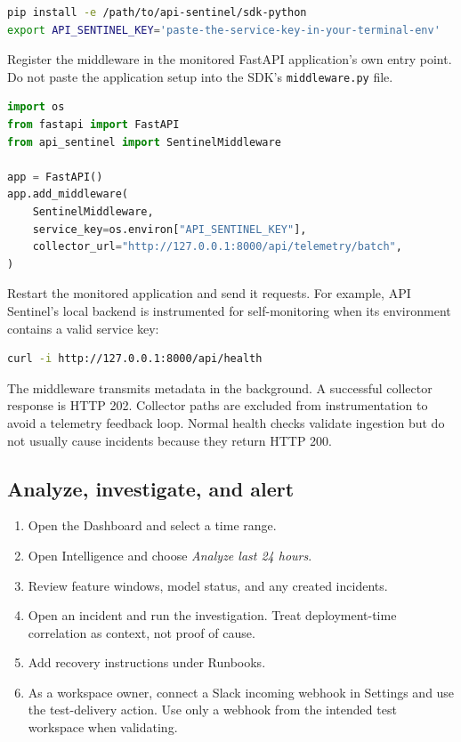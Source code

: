 \documentclass[11pt,a4paper]{article}
\begin{document}
\begin{lstlisting}[language=bash]
pip install -e /path/to/api-sentinel/sdk-python
export API_SENTINEL_KEY='paste-the-service-key-in-your-terminal-env'
\end{lstlisting}

Register the middleware in the monitored FastAPI application's own entry point.
Do not paste the application setup into the SDK's \texttt{middleware.py} file.

\begin{lstlisting}[language=Python]
import os
from fastapi import FastAPI
from api_sentinel import SentinelMiddleware

app = FastAPI()
app.add_middleware(
    SentinelMiddleware,
    service_key=os.environ["API_SENTINEL_KEY"],
    collector_url="http://127.0.0.1:8000/api/telemetry/batch",
)
\end{lstlisting}

Restart the monitored application and send it requests. For example, API
Sentinel's local backend is instrumented for self-monitoring when its environment
contains a valid service key:

\begin{lstlisting}[language=bash]
curl -i http://127.0.0.1:8000/api/health
\end{lstlisting}

The middleware transmits metadata in the background. A successful collector
response is HTTP 202. Collector paths are excluded from instrumentation to avoid
a telemetry feedback loop. Normal health checks validate ingestion but do not
usually cause incidents because they return HTTP 200.

\subsection{Analyze, investigate, and alert}
\begin{enumerate}
  \item Open the Dashboard and select a time range.
  \item Open Intelligence and choose \textit{Analyze last 24 hours}.
  \item Review feature windows, model status, and any created incidents.
  \item Open an incident and run the investigation. Treat deployment-time
  correlation as context, not proof of cause.
  \item Add recovery instructions under Runbooks.
  \item As a workspace owner, connect a Slack incoming webhook in Settings and
  use the test-delivery action. Use only a webhook from the intended test
  workspace when validating.
\end{enumerate}
\end{document}
